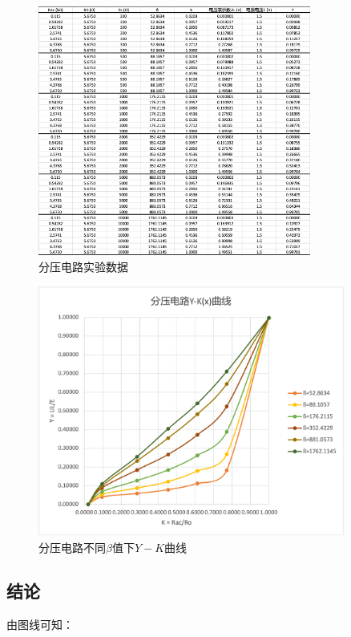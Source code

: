 \documentclass{article}
\begin{document}
\begin{figure}[htbp]
    \centering
    \includegraphics[width=0.8\textwidth]{voltage-control-data.png}
    \caption{分压电路实验数据}
\end{figure}

\begin{figure}[htbp]
    \centering
    \includegraphics[width=0.9\textwidth]{voltage-control-plot.png}
    \caption{分压电路不同$\beta$值下$Y-K$曲线}
\end{figure}

\subsection{结论}
由图线可知：
\end{document}
